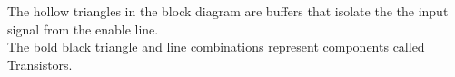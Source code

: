 \documentclass[../TinyBot.tex]{subfiles}
\begin{document}
The hollow triangles in the block diagram are buffers that isolate the the input signal from
the enable line. \\

The bold black triangle and line combinations represent components called Transistors. 


    
        




\end{document}
